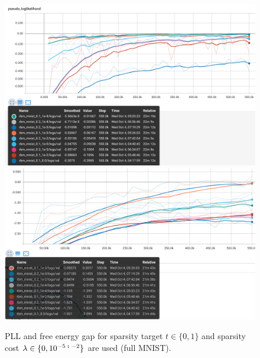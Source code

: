 \begin{figure}[h]
\begin{mdframed}
\centering
\includegraphics[width=5.6in]{rbm-mnist/st_pll.png}
\\[2em]
\includegraphics[width=5.6in]{rbm-mnist/st_feg.png}
\caption{PLL and free energy gap for sparsity target $t\in\{0,1\}$ and sparsity cost $\lambda \in \{0, 10^{-5\;\textbf{:}\;-2}\}$ are used (full MNIST).}
\end{mdframed}
\end{figure}

\clearpage

